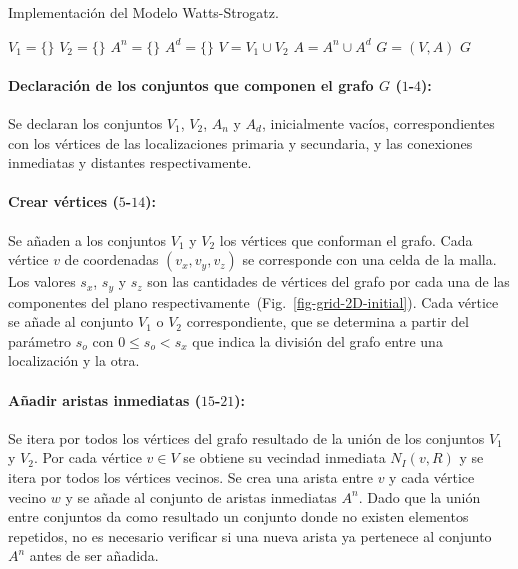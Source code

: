 \begin{algorithm}[!ht]
\caption{Implementaci\'on del Modelo Watts-Strogatz.} \label{alg-watts}
$V_1=\lbrace \rbrace$\;
$V_2=\lbrace \rbrace$\;
$A^n=\lbrace \rbrace$\;
$A^d=\lbrace \rbrace$\;
$V=V_1 \cup V_2$\;
$A=A^n \cup A^d$\;
$G=(V,A)$\;
\Return $G$\;
\end{algorithm}

\paragraph{Declaraci\'on de los conjuntos que componen el grafo $G$ ($1$-$4$):} Se declaran los conjuntos $V_1$, $V_2$, $A_n$ y $A_d$, inicialmente vac\'ios, correspondientes con los v\'ertices de las localizaciones primaria y secundaria, y las conexiones inmediatas y distantes respectivamente. 

\paragraph{Crear v\'ertices ($5$-$14$):} Se a\~naden a los conjuntos $V_1$ y $V_2$ los v\'ertices que conforman el grafo. Cada v\'ertice $v$ de coordenadas $(v_x,v_y, v_z)$ se corresponde con una celda de la malla. Los valores $s_x$, $s_y$ y $s_z$ son las cantidades de v\'ertices del grafo por cada una de las componentes del plano respectivamente~(Fig.~\ref{fig-grid-2D-initial}). Cada v\'ertice se a\~nade al conjunto $V_1$ o $V_2$ correspondiente, que se determina a partir del par\'ametro $s_o$ con $0 \leq s_o < s_x$ que indica la divisi\'on del grafo entre una localizaci\'on y la otra. 

\paragraph{A\~nadir aristas inmediatas ($15$-$21$):} Se itera por todos los v\'ertices del grafo resultado de la uni\'on de los conjuntos $V_1$ y $V_2$. Por cada v\'ertice $v \in V$ se obtiene su vecindad inmediata $N_I(v,R)$ y se itera por todos los v\'ertices vecinos. Se crea una arista entre $v$ y cada v\'ertice vecino $w$ y se a\~nade al conjunto de aristas inmediatas $A^n$. Dado que la uni\'on entre conjuntos da como resultado un conjunto donde no existen elementos repetidos, no es necesario verificar si una nueva arista ya pertenece al conjunto $A^n$ antes de ser a\~nadida.

